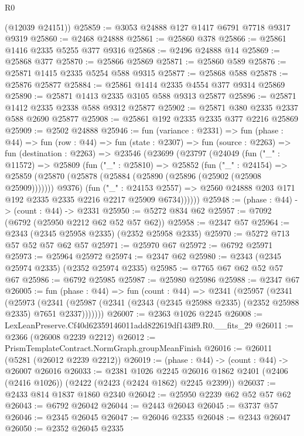 \begin{lexlean}{R0}
\begin{coremodule}
      (@12039 @24151))
@25859 := @3053 @24888 @127 @1417 @6791 @7718 @9317 @9319
@25860 := @2468 @24888
@25861 := @25860 @378
@25866 := @25861 @1416 @2335 @5255 @377 @9316
@25868 := @2496 @24888 @14
@25869 := @25868 @377
@25870 := @25866 @25869
@25871 := @25860 @589
@25876 := @25871 @1415 @2335 @5254 @588 @9315
@25877 := @25868 @588
@25878 := @25876 @25877
@25884 := @25861 @1414 @2335 @4554 @377 @9314 @25869
@25890 := @25871 @1413 @2335 @3105 @588 @9313 @25877
@25896 := @25871 @1412 @2335 @2338 @588 @9312 @25877
@25902 := @25871 @380 @2335 @2337 @588 @2690 @25877
@25908 := @25861 @192 @2335 @2335 @377 @2216 @25869
@25909 := @2502 @24888
@25946 := fun (variance : @2331) =>
  fun (phase : @44) =>
  fun (row : @44) =>
  fun (state : @2307) =>
  fun (source : @2263) =>
  fun (destination : @2263) =>
  @23546
    (@23699
      (@23797
        (@24049
          (fun ("_" : @11572) =>
          @25809
            (fun ("_" : @25810) =>
            @25852
              (fun ("_" : @24154) =>
              @25859 (@25870 (@25878 (@25884 (@25890 (@25896 (@25902 (@25908 @25909))))))) @9376)
              (fun ("_" : @24153 @2557) =>
              @2560 @24888 @203 @171 @192 @2335 @2335 @2216 @2217 @25909 @6734))))))
@25948 := (phase : @44) -> (count : @44) -> @2331
@25950 := @5272 @834 @62
@25957 := @7092 (@6792 (@25950 @2212 @62 @52 @57 @62))
@25958 := @2347 @57
@25964 := @2343 (@2345 @25958 @2335) (@2352 @25958 @2335)
@25970 := @5272 @713 @57 @52 @57 @62 @57
@25971 := @25970 @67
@25972 := @6792 @25971
@25973 := @25964 @25972
@25974 := @2347 @62
@25980 := @2343 (@2345 @25974 @2335) (@2352 @25974 @2335)
@25985 := @7765 @67 @62 @52 @57 @67
@25986 := @6792 @25985
@25987 := @25980 @25986
@25988 := @2347 @67
@26005 := fun (phase : @44) =>
  fun (count : @44) =>
  @2341
    (@25957
      (@2341
        (@25973
          (@2341 (@25987 (@2341 (@2343 (@2345 @25988 @2335) (@2352 @25988 @2335) @7651 @2337)))))))
@26007 := @2363 @1026 @2245
@26008 := LexLeanPreserve.Cf40d62359146011add822619df143ff9.R0.__fits_29
@26011 := @2366 (@26008 @2239 @2212)
@26012 := PrismTemplateContract.NormGraph.groupMeanFinish
@26016 := @26011 (@5281 (@26012 @2239 @2212))
@26019 := (phase : @44) -> (count : @44) -> @26007 @26016
@26033 := @2381
    @1026
    @2245
    @26016
    @1862
    @2401
    (@2406 (@2416 @1026))
    (@2422 (@2423 (@2424 @1862) @2245 @2399))
@26037 := @2433 @814 @1837 @1860 @2340
@26042 := @25950 @2239 @62 @52 @57 @62
@26043 := @6792 @26042
@26044 := @2443 @26043
@26045 := @3737 @57
@26046 := @2345 @26045
@26047 := @26046 @2335
@26048 := @2343 @26047
@26050 := @2352 @26045 @2335

\end{coremodule}
\end{lexlean}
